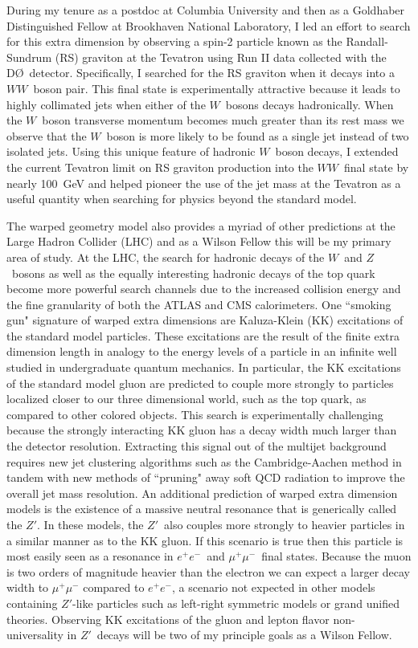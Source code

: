 \documentclass[12pt]{article}
\newcommand{\dzero}{D\O}
\begin{document}
During my tenure as a postdoc at Columbia University and then as a Goldhaber Distinguished Fellow at Brookhaven National Laboratory, I led an effort to search for this extra dimension by observing a spin-2 particle known as the Randall-Sundrum (RS) graviton at the Tevatron using Run II data collected with the \dzero~detector. Specifically, I searched for the RS graviton when it decays into a $WW$~boson pair. This final state is experimentally attractive because it leads to highly collimated jets when either of the $W$~bosons decays hadronically. When the $W$~boson transverse momentum becomes much greater than its rest mass we observe that the $W$~boson is more likely to be found as a single jet instead of two isolated jets. Using this unique feature of hadronic $W$~boson decays, I extended the current Tevatron limit on RS graviton production into the $WW$~final state by nearly 100~GeV and helped pioneer the use of the jet mass at the Tevatron as a useful quantity when searching for physics beyond the standard model. 

The warped geometry model also provides a myriad of other predictions at the Large Hadron Collider (LHC) and as a Wilson Fellow this will be my primary area of study. At the LHC, the search for hadronic decays of the $W$~and $Z$~bosons as well as the equally interesting hadronic decays of the top quark become more powerful search channels due to the increased collision energy and the fine granularity of both the ATLAS and CMS calorimeters. One ``smoking gun" signature of warped extra dimensions are Kaluza-Klein (KK) excitations of the standard model particles. These excitations are the result of the finite extra dimension length in analogy to the energy levels of a particle in an infinite well studied in undergraduate quantum mechanics. In particular, the KK excitations of the standard model gluon are predicted to couple more strongly to particles localized closer to our three dimensional world, such as the top quark, as compared to other colored objects. This search is experimentally challenging because the strongly interacting KK gluon has a decay width much larger than the detector resolution. Extracting this signal out of the multijet background requires new jet clustering algorithms such as the Cambridge-Aachen method in tandem with new methods of ``pruning" away soft QCD radiation to improve the overall jet mass resolution. An additional prediction of warped extra dimension models is the existence of a massive neutral resonance that is generically called the $Z'$. In these models, the $Z'$~also couples more strongly to heavier particles in a similar manner as to the KK gluon. If this scenario is true then this particle is most easily seen as a resonance in $e^{+}e^{-}$~and $\mu^{+}\mu^{-}$~final states. Because the muon is two orders of magnitude heavier than the electron we can expect a larger decay width to $\mu^{+}\mu^{-}$ compared to $e^{+}e^{-}$, a scenario not expected in other models containing $Z'$-like particles such as left-right symmetric models or grand unified theories. Observing KK excitations of the gluon and lepton flavor non-universality in $Z'$~decays will be two of my principle goals as a Wilson Fellow.
\end{document}
